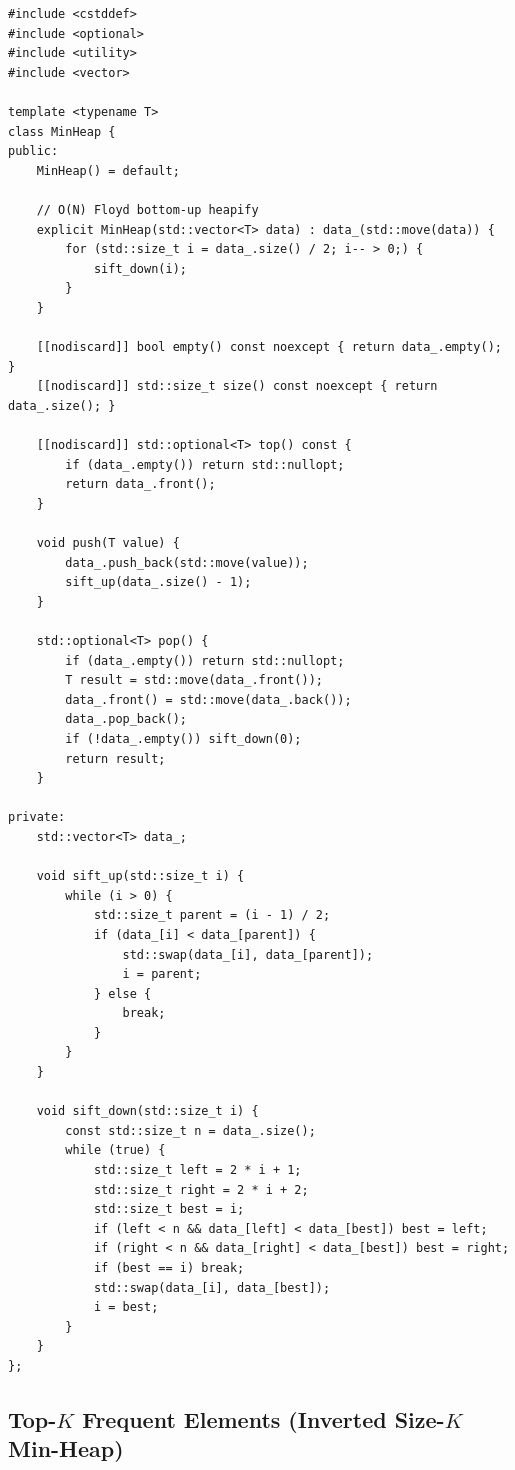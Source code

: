 \documentclass[11pt,a4paper]{article}
\theoremstyle{definition}
\begin{document}
\begin{lstlisting}[caption={From-scratch \texttt{MinHeap<T>} with $O(N)$ bottom-up heapify constructor.}]
#include <cstddef>
#include <optional>
#include <utility>
#include <vector>

template <typename T>
class MinHeap {
public:
    MinHeap() = default;

    // O(N) Floyd bottom-up heapify
    explicit MinHeap(std::vector<T> data) : data_(std::move(data)) {
        for (std::size_t i = data_.size() / 2; i-- > 0;) {
            sift_down(i);
        }
    }

    [[nodiscard]] bool empty() const noexcept { return data_.empty(); }
    [[nodiscard]] std::size_t size() const noexcept { return data_.size(); }

    [[nodiscard]] std::optional<T> top() const {
        if (data_.empty()) return std::nullopt;
        return data_.front();
    }

    void push(T value) {
        data_.push_back(std::move(value));
        sift_up(data_.size() - 1);
    }

    std::optional<T> pop() {
        if (data_.empty()) return std::nullopt;
        T result = std::move(data_.front());
        data_.front() = std::move(data_.back());
        data_.pop_back();
        if (!data_.empty()) sift_down(0);
        return result;
    }

private:
    std::vector<T> data_;

    void sift_up(std::size_t i) {
        while (i > 0) {
            std::size_t parent = (i - 1) / 2;
            if (data_[i] < data_[parent]) {
                std::swap(data_[i], data_[parent]);
                i = parent;
            } else {
                break;
            }
        }
    }

    void sift_down(std::size_t i) {
        const std::size_t n = data_.size();
        while (true) {
            std::size_t left = 2 * i + 1;
            std::size_t right = 2 * i + 2;
            std::size_t best = i;
            if (left < n && data_[left] < data_[best]) best = left;
            if (right < n && data_[right] < data_[best]) best = right;
            if (best == i) break;
            std::swap(data_[i], data_[best]);
            i = best;
        }
    }
};
\end{lstlisting}

\subsection{Top-\texorpdfstring{$K$}{K} Frequent Elements (Inverted Size-\texorpdfstring{$K$}{K} Min-Heap)}
\end{document}

